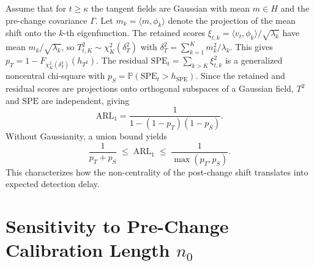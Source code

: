 \documentclass{article}
\theoremstyle{plain}
\theoremstyle{definition}
\theoremstyle{remark}
\begin{document}
Assume that for $t \ge \kappa$ the tangent fields are Gaussian
with mean $m \in H$ and the pre-change covariance $\Gamma$.
Let $m_k = \langle m, \phi_k \rangle$ denote the projection
of the mean shift onto the $k$-th eigenfunction.
The retained scores $\xi_{t,k} = \langle v_t, \phi_k \rangle
/ \sqrt{\lambda_k}$ have mean $m_k / \sqrt{\lambda_k}$,
so $T^2_{t,K} \sim \chi^2_K(\delta_T^2)$ with
$\delta_T^2 = \sum_{k=1}^K m_k^2 / \lambda_k$.
This gives $p_T = 1 - F_{\chi^2_K(\delta_T^2)}(h_{T^2})$.
The residual $\mathrm{SPE}_t = \sum_{k>K} \xi_{t,k}^2$ is a
generalized noncentral chi-square with
$p_S = \mathbb{P}(\mathrm{SPE}_t > h_{\mathrm{SPE}})$.
Since the retained and residual scores are projections
onto orthogonal subspaces of a Gaussian field,
$T^2$ and $\mathrm{SPE}$ are independent, giving
\[
  \mathrm{ARL}_1
  = \frac{1}{1 - (1-p_T)(1-p_S)}.
\]
Without Gaussianity, a union bound yields
\[
  \frac{1}{p_T + p_S}
  \;\le\; \mathrm{ARL}_1
  \;\le\; \frac{1}{\max(p_T, p_S)}.
\]
This characterizes how the non-centrality of the post-change shift translates into expected detection delay.

\section{Sensitivity to Pre-Change Calibration Length $n_0$}\label{app:n0_sensitivity}
\end{document}
